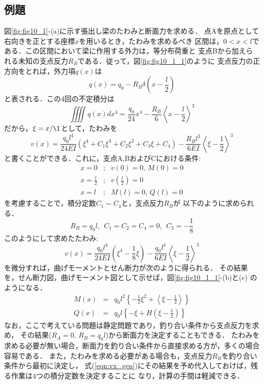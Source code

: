 \documentclass[10pt,a4j]{jarticle}
\begin{document}
\subsection{例題}
図\ref{fig:fig10_1}-(a)に示す張出し梁のたわみと断面力を求める．
点Aを原点として右向きを正とする座標$x$を用いるとき，たわみを求めるべき
区間は，$0<x<l$である．この区間において梁に作用する外力は，等分布荷重と
支点Bから加えられる未知の支点反力$R_B$である．従って，図\ref{fig:fig10_1_1}のように
支点反力の正方向をとれば，外力項$q(x)$は
\begin{equation}
	q(x)=q_0-R_B\delta\left(x-\frac{l}{2}\right)
	\label{eqn:qx}
\end{equation}
と表される．この4回の不定積分は
\begin{equation}
	\iiiint q(x) dx^4= \frac{q_0}{24}x^4-\frac{R_B}{6}\left<x-\frac{l}{2}\right>^3
	\label{eqn:int_qx4}
\end{equation}
だから，$\xi=x/\l$として，たわみを
\begin{equation}
	v(x)=\frac{q_0l^4}{24EI}\left( \xi^4+C_1\xi^3 +C_2\xi^2+C_3\xi+C_4\right)
	-
	\frac{R_Bl^3}{6EI}\left< \xi-\frac{1}{2}\right>^3
	\label{eqn:vx_gen}
\end{equation}
と書くことができる．これに，支点A,BおよびCにおける条件:
\begin{eqnarray}
	x=0 &;& v(0)=0, \, M(0)=0 
	\\
	x=\frac{l}{2} &;& v\left( \frac{l}{2} \right)=0
	\\
	x=l &;& M(l)=0,\, Q(l)=0
\end{eqnarray}
を考慮することで，積分定数$C_1\sim C_4$と，支点反力$R_B$が
以下のように求められる．
\begin{equation}
	R_B=q_0l, \ \ C_1=C_2=C_4=0, \ \ C_3=-\frac{1}{8}
\end{equation}
このようにして求めたたわみ:
\begin{equation}
	v(x)=\frac{q_0l^4}{24EI}\left( \xi^4-\frac{1}{8}\xi\right)
	-
	\frac{q_0l^4}{6EI}\left< \xi-\frac{1}{2}\right>^3
	\label{eqn:vx}
\end{equation}
を微分すれば，曲げモーメントとせん断力が次のように得られる．
その結果を，せん断力図，曲げモーメント図として示せば，図\ref{fig:fig10_1_1}-(b)と(c)
のようになる．
\begin{eqnarray}
	M(x)&=&
	q_0l^2 \left\{ -\frac{1}{2}\xi^2 + \left< \xi -\frac{1}{2}\right> \right\}
	\\
	Q(x)&=&
	q_0l \left\{-\xi+H\left(\xi-\frac{1}{2}\right)\right\}
\end{eqnarray}
なお，ここで考えている問題は静定問題であり，釣り合い条件から支点反力を求め，
その結果($R_A=0,\, R_B=q_0l$)から断面力を決定することもできる．
たわみを求める必要が無い場合，断面力を釣り合い条件から直接求める方が，多くの場合容易である．
また，たわみを求める必要がある場合も，支点反力$R_B$を釣り合い条件から最初に決定し，
式(\ref{eqn:vx_gen})にその結果を予め代入しておけば，残る作業は4つの積分定数を決定することに
なり，計算の手間は軽減できる．
\end{document}
